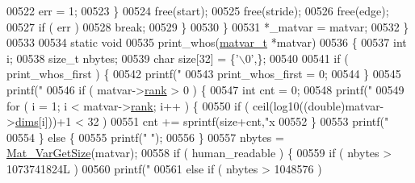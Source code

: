 \begin{DoxyCode}
{{{{{{{{{{{00522                 err = 1;
00523             \}
00524             free(start);
00525             free(stride);
00526             free(edge);
00527             \textcolor{keywordflow}{if} ( err )
00528                 \textcolor{keywordflow}{break};
00529         \}
00530     \}
00531     *\_matvar = matvar;
00532 \}
00533 
00534 \textcolor{keyword}{static} \textcolor{keywordtype}{void}
00535 print\_whos(\hyperlink{group___m_a_t_structmatvar__t}{matvar\_t} *matvar)
00536 \{
00537     \textcolor{keywordtype}{int} i;
00538     \textcolor{keywordtype}{size\_t} nbytes;
00539     \textcolor{keywordtype}{char} size[32] = \{\textcolor{charliteral}{'\(\backslash\)0'},\};
00540 
00541     \textcolor{keywordflow}{if} ( print\_whos\_first ) \{
00542         printf(\textcolor{stringliteral}{"%
00543         print\_whos\_first = 0;
00544     \}
00545     printf(\textcolor{stringliteral}{"%
00546     \textcolor{keywordflow}{if} ( matvar->\hyperlink{group___m_a_t_a84ba70c96ded13cc555fa75b768d9921}{rank} > 0 ) \{
00547         \textcolor{keywordtype}{int} cnt = 0;
00548         printf(\textcolor{stringliteral}{"%
00549         \textcolor{keywordflow}{for} ( i = 1; i < matvar->\hyperlink{group___m_a_t_a84ba70c96ded13cc555fa75b768d9921}{rank}; i++ ) \{
00550             \textcolor{keywordflow}{if} ( ceil(log10((\textcolor{keywordtype}{double})matvar->\hyperlink{group___m_a_t_a8e01234e1c862ce3472bb37f5a09b92c}{dims}[i]))+1 < 32 )
00551                 cnt += sprintf(size+cnt,\textcolor{stringliteral}{"x%
00552         \}
00553         printf(\textcolor{stringliteral}{"%
00554     \} \textcolor{keywordflow}{else} \{
00555         printf(\textcolor{stringliteral}{"                    "});
00556     \}
00557     nbytes = \hyperlink{group___m_a_t_gaeeb798fead2f765bddfb19016c7fdbcc}{Mat\_VarGetSize}(matvar);
00558     \textcolor{keywordflow}{if} ( human\_readable ) \{
00559         \textcolor{keywordflow}{if} ( nbytes > 1073741824L )
00560             printf(\textcolor{stringliteral}{" %
00561         \textcolor{keywordflow}{else} \textcolor{keywordflow}{if} ( nbytes > 1048576 )
}}}}}}}}}}}}}}}}}
\end{DoxyCode}
